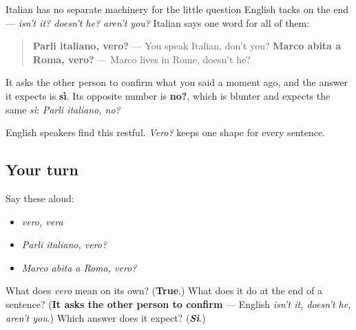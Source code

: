 \begin{grammarlens}[title={Grammar lens: the turn it does at the end of a sentence}]
Italian has no separate machinery for the little question English tacks on the end — \emph{isn't it? doesn't he? aren't you?} Italian says one word for all of them:

\begin{quote}
\textbf{Parli italiano, vero?} — You speak Italian, don't you? \textbf{Marco abita a Roma, vero?} — Marco lives in Rome, doesn't he?
\end{quote}

It asks the other person to confirm what you said a moment ago, and the answer it expects is \textbf{sì}. Its opposite number is \textbf{no?}, which is blunter and expects the same \emph{sì}: \emph{Parli italiano, no?}

English speakers find this restful. \emph{Vero?} keeps one shape for every sentence.
\end{grammarlens}

\subsection*{Your turn}
Say these aloud:

\begin{itemize}
\raggedright
  \item \emph{vero, vera}
  \item \emph{Parli italiano, vero?}
  \item \emph{Marco abita a Roma, vero?}
\end{itemize}

\begin{tcolorbox}[breakable,colback=teal!4,colframe=teal!35!black,title={Before you move on}]
What does \emph{vero} mean on its own? (\textbf{True}.) What does it do at the end of a sentence? (\textbf{It asks the other person to confirm} — English \emph{isn't it, doesn't he, aren't you}.) Which answer does it expect? (\emph{\textbf{Sì}}.)
\end{tcolorbox}
